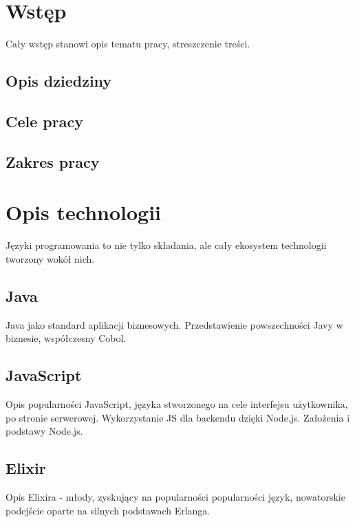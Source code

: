 \section{Wstęp}\label{wstux119p}

Cały wstęp stanowi opis tematu pracy, streszczenie treści.

\subsection{Opis dziedziny}\label{opis-dziedziny}

\subsection{Cele pracy}\label{cele-pracy}

\subsection{Zakres pracy}\label{zakres-pracy}

\section{Opis technologii}\label{opis-technologii}

Języki programowania to nie tylko składania, ale cały ekosystem
technologii tworzony wokół nich.

\subsection{Java}\label{java}

Java jako standard aplikacji biznesowych. Przedstawienie powszechności
Javy w biznesie, współczesny Cobol.

\subsection{JavaScript}\label{javascript}

Opis popularności JavaScript, języka stworzonego na cele interfejsu
użytkownika, po stronie serwerowej. Wykorzystanie JS dla backendu dzięki
Node.js. Założenia i podstawy Node.js.

\subsection{Elixir}\label{elixir}

Opis Elixira - młody, zyskujący na popularności popularności język,
nowatorskie podejście oparte na silnych podstawach Erlanga.

